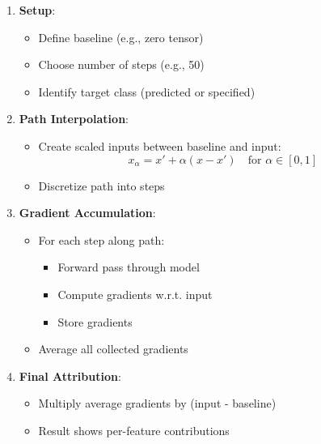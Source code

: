 \documentclass{article}
\begin{document}
\begin{enumerate}
    \item \textbf{Setup}:
        \begin{itemize}
            \item Define baseline (e.g., zero tensor)
            \item Choose number of steps (e.g., 50)
            \item Identify target class (predicted or specified)
        \end{itemize}
    
    \item \textbf{Path Interpolation}:
        \begin{itemize}
            \item Create scaled inputs between baseline and input:
            \begin{equation}
                x_\alpha = x' + \alpha(x - x') \quad \text{for } \alpha \in [0,1]
            \end{equation}
            \item Discretize path into steps
        \end{itemize}
    
    \item \textbf{Gradient Accumulation}:
        \begin{itemize}
            \item For each step along path:
                \begin{itemize}
                    \item Forward pass through model
                    \item Compute gradients w.r.t. input
                    \item Store gradients
                \end{itemize}
            \item Average all collected gradients
        \end{itemize}
    
    \item \textbf{Final Attribution}:
        \begin{itemize}
            \item Multiply average gradients by (input - baseline)
            \item Result shows per-feature contributions
        \end{itemize}
\end{enumerate}
\end{document}

